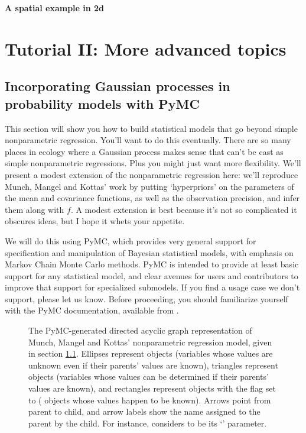 \documentclass{manual}
\begin{document}
\textbf{A spatial example in 2d}

\chapter{Tutorial II: More advanced topics}\label{cha:adv} %

\section{Incorporating Gaussian processes in probability models with PyMC}\label{sec:PyMC} %
This section will show you how to build statistical models that go beyond simple nonparametric regression. You'll want to do this eventually. There are so many places in ecology where a Gaussian process makes sense that can't be cast as simple nonparametric regressions. Plus you might just want more flexibility. We'll present a modest extension of the nonparametric regression here: we'll reproduce Munch, Mangel and Kottas' work by putting `hyperpriors' on the parameters of the mean and covariance functions, as well as the observation precision, and infer them along with $f$. A modest extension is best because it's not so complicated it obscures ideas, but I hope it whets your appetite.

We will do this using PyMC, which provides very general support for specification and manipulation of Bayesian statistical models, with emphasis on Markov Chain Monte Carlo methods. PyMC is intended to provide at least basic support for any statistical model, and clear avenues for users and contributors to improve that support for specialized submodels. If you find a usage case we don't support, please let us know. Before proceeding, you should familiarize yourself with the PyMC documentation, available from .

\begin{figure}
	\centering
	\caption{The PyMC-generated directed acyclic graph representation of Munch, Mangel and Kottas' nonparametric regression model, given in section \ref{sec:PyMC}. Ellipses represent  objects (variables whose values are unknown even if their parents' values are known), triangles represent  objects (variables whose values can be determined if their parents' values are known), and rectangles represent  objects with the  flag set to  ( objects whose values happen to be known). Arrows point from parent to child, and arrow labels show the name assigned to the parent by the child. For instance,  considers  to be its `' parameter.}
	\label{fig:unobservedModel}
\end{figure}
\end{document}
